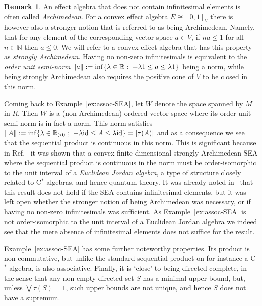 \documentclass[a4paper, onecolumn, accepted=2020-12-22]{quantumarticle}
\DeclarePairedDelimiter{\norm}{\lVert}{\rVert}
\newcommand{\R}{\mathbb{R}}
\newcommand{\N}{\mathbb{N}}
\newcommand{\id}{\text{id}}
\newcounter{counter}
\theoremstyle{definition}
\newtheorem{remark}[counter]{Remark}
\begin{document}
\begin{remark}
An effect algebra that does not contain infinitesimal elements is often called \emph{Archimedean}. 
For a convex effect algebra $E\cong [0,1]_V$ there is however also a stronger notion that is referred to as being Archimedean. 
Namely, that for any element of the corresponding vector space $a\in V$, if $na\leq 1$ for all $n\in \N$ then $a\leq 0$. 
We will refer to a convex effect algebra that has this property as \emph{strongly Archimedean}.
Having no non-zero infinitesimals is equivalent to the \emph{order unit semi-norm} $\norm{a}:=\inf\{\lambda\in \R~;~-\lambda 1 \leq a \leq \lambda 1\}$ being a norm, while being strongly Archimedean also requires the positive cone of $V$ to be closed in this norm.
\end{remark}

Coming back to Example~\ref{ex:assoc-SEA}, let $W$ denote the space spanned by $M$ in $R$. 
Then $W$ is a (non-Archimedean) ordered vector space where its order-unit semi-norm is in fact a norm. This norm satisfies $\norm{A} := \inf\{\lambda \in \R_{>0}~;~-\lambda \id \leq A\leq \lambda \id\} = \lvert \tau(A)\rvert$ and as a consequence we see that the sequential product is continuous in this norm.
This is significant because in Ref.~\cite{wetering2018sequential} it was shown that a convex finite-dimensional strongly Archimedean SEA where the sequential product is continuous in the norm must be order-isomorphic to the unit interval of a \emph{Euclidean Jordan algebra}, a type of structure closely related to C$^*$-algebras, and hence quantum theory.
It was already noted in~\cite{wetering2018sequential} that this result does not hold if the SEA contains infinitesimal elements, but it was left open whether the stronger notion of being Archimedean was necessary, or if having no non-zero infinitesimals was sufficient.
As Example~\ref{ex:assoc-SEA} is not order-isomorphic to the unit interval of a Euclidean Jordan algebra we indeed see that the mere absence of infinitesimal elements does not suffice for the result.

Example~\ref{ex:assoc-SEA} has some further noteworthy properties. Its product is non-commutative, but unlike the standard sequential product on for instance a C$^*$-algebra, is also associative. 
Finally, it is `close' to being directed complete, in the sense that any non-empty directed set $S$ has a minimal upper bound, but, unless $\bigvee \tau(S) = 1$, such upper bounds are not unique, and hence $S$ does not have a supremum.
\end{document}
